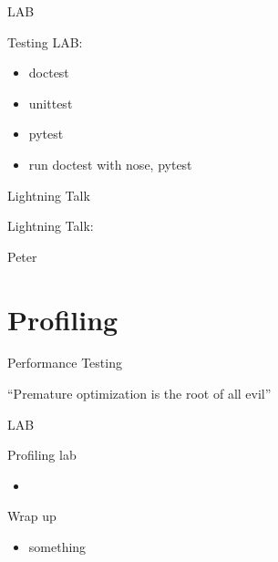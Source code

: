 \documentclass{beamer}
\begin{document}
\begin{frame}{LAB}

{\Large Testing LAB:}

\begin{itemize}
  \item doctest
  \item unittest
  \item pytest
  \item run doctest with nose, pytest
\end{itemize}

\end{frame}

\begin{frame}{Lightning Talk}

{\centering

\vfill
{\LARGE Lightning Talk:  }

\vfill
{\Huge Peter}

\vfill
}
\end{frame}


\section{Profiling}

\begin{frame}[fragile]{Performance Testing}

 {\Large ``Premature optimization is the root of all evil''}

\end{frame} 

\begin{frame}{LAB}

{\Large Profiling lab}

\begin{itemize}
  \item
\end{itemize}

\end{frame}



\begin{frame}{Wrap up}

\begin{itemize}
  \item something
\end{itemize}

\end{frame}
\end{document}
